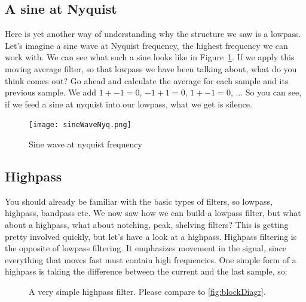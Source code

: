 \subsection{A sine at Nyquist}
Here is yet another way of understanding why the structure we saw is a lowpass. Let's imagine a sine wave at Nyquist frequency, the highest frequency we can work with. We can see what such a sine looks like in Figure~\ref{fig:nyqSine}. If we apply this moving average filter, so that lowpass we have been talking about, what do you think comes out? Go ahead and calculate the average for each sample and its previous sample. We add $1 + -1 = 0$, $-1 + 1 = 0$, $1 + -1 = 0$, ... So you can see, if we feed a sine at nyquist into our lowpass, what we get is silence.


\begin{figure}[H]
	\centering
	\texttt{[image: sineWaveNyq.png]}
	\caption[Sine wave at nyquist frequency]
	{Sine wave at nyquist frequency}
	\label{fig:nyqSine}
\end{figure}


\subsection{Highpass} %
\label{sub:Highpass}

You should already be familiar with the basic types of filters, so lowpass, highpass, bandpass etc. We now saw how we can build a lowpass filter, but what about a highpass, what about notching, peak, shelving filters? This is getting pretty involved quickly, but let's have a look at a highpass. Highpass filtering is the opposite of lowpass filtering. It emphasizes movement in the signal, since everything that moves fast must contain high frequencies. One simple form of a highpass is taking the difference between the current and the last sample, so:


\begin{figure}[H]
  \centering
  \label{fig:string}
  \caption{A very simple highpass filter. Please compare to \ref{fig:blockDiagr}. }
  \label{fig:blockDiagrHigh}
\end{figure}

